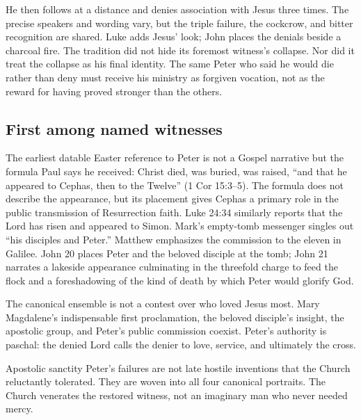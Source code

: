 He then follows at a distance and denies association with Jesus three times.
The precise speakers and wording vary, but the triple failure, the cockcrow,
and bitter recognition are shared. Luke adds Jesus' look; John places the
denials beside a charcoal fire. The tradition did not hide its foremost
witness's collapse. Nor did it treat the collapse as his final identity. The
same Peter who said he would die rather than deny must receive his ministry as
forgiven vocation, not as the reward for having proved stronger than the
others.

\subsection{First among named witnesses}

The earliest datable Easter reference to Peter is not a Gospel narrative but
the formula Paul says he received: Christ died, was buried, was raised, ``and
that he appeared to Cephas, then to the Twelve'' (1 Cor 15:3--5). The formula
does not describe the appearance, but its placement gives Cephas a primary
role in the public transmission of Resurrection faith. Luke 24:34 similarly
reports that the Lord has risen and appeared to Simon. Mark's empty-tomb
messenger singles out ``his disciples and Peter.'' Matthew emphasizes the
commission to the eleven in Galilee. John 20 places Peter and the beloved
disciple at the tomb; John 21 narrates a lakeside appearance culminating in
the threefold charge to feed the flock and a foreshadowing of the kind of
death by which Peter would glorify God.

The canonical ensemble is not a contest over who loved Jesus most. Mary
Magdalene's indispensable first proclamation, the beloved disciple's insight,
the apostolic group, and Peter's public commission coexist. Peter's authority
is paschal: the denied Lord calls the denier to love, service, and ultimately
the cross.

\begin{studybox}{Apostolic sanctity}
Peter's failures are not late hostile inventions that the Church reluctantly
tolerated. They are woven into all four canonical portraits. The Church
venerates the restored witness, not an imaginary man who never needed mercy.
\end{studybox}
